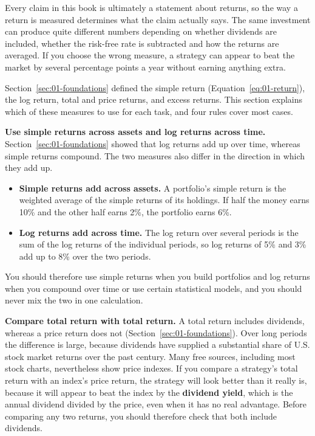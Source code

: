 Every claim in this book is ultimately a statement about returns, so the way a return is measured determines what the claim actually says. The same investment can produce quite different numbers depending on whether dividends are included, whether the risk-free rate is subtracted and how the returns are averaged. If you choose the wrong measure, a strategy can appear to beat the market by several percentage points a year without earning anything extra.

Section~\ref{sec:01-foundations} defined the simple return (Equation~\eqref{eq:01-return}), the log return, total and price returns, and excess returns. This section explains which of these measures to use for each task, and four rules cover most cases.

\textbf{Use simple returns across assets and log returns across time.} Section~\ref{sec:01-foundations} showed that log returns add up over time, whereas simple returns compound. The two measures also differ in the direction in which they add up.

\begin{itemize}
  \item \textbf{Simple returns add across assets.} A portfolio's simple return is the weighted average of the simple returns of its holdings. If half the money earns 10\% and the other half earns 2\%, the portfolio earns 6\%.
  \item \textbf{Log returns add across time.} The log return over several periods is the sum of the log returns of the individual periods, so log returns of 5\% and 3\% add up to 8\% over the two periods.
\end{itemize}

You should therefore use simple returns when you build portfolios and log returns when you compound over time or use certain statistical models, and you should never mix the two in one calculation.

\textbf{Compare total return with total return.} A total return includes dividends, whereas a price return does not (Section~\ref{sec:01-foundations}). Over long periods the difference is large, because dividends have supplied a substantial share of U.S. stock market returns over the past century. Many free sources, including most stock charts, nevertheless show price indexes. If you compare a strategy's total return with an index's price return, the strategy will look better than it really is, because it will appear to beat the index by the \textbf{dividend yield}, which is the annual dividend divided by the price, even when it has no real advantage. Before comparing any two returns, you should therefore check that both include dividends.


